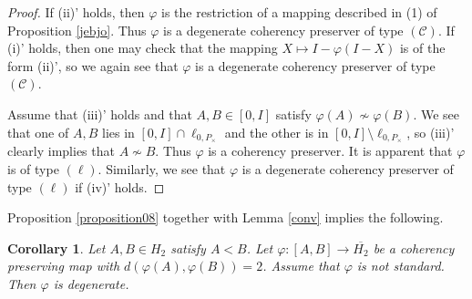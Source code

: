\documentclass[10pt]{amsart}
\newtheorem{corollary}[theorem]{Corollary}
\theoremstyle{definition}
\theoremstyle{remark}
\numberwithin{subsection}{section}
\numberwithin{equation}{section}
\newcommand\oH{{\overline{H_2}}}
\begin{document}
\begin{proof}
If (ii)' holds, then $\varphi$ is the restriction of a mapping described in (1) of Proposition \ref{jebjo}. 
Thus $\varphi$ is a degenerate coherency preserver of type $(\mathcal{C})$. 
If (i)' holds, then one may check that the mapping $X\mapsto I-\varphi(I-X)$ is of the form (ii)', so we again see that $\varphi$ is a degenerate coherency preserver of type $(\mathcal{C})$.

Assume that (iii)' holds 
and that $A, B\in [0,I]$ satisfy $\varphi(A)\not\sim\varphi(B)$. 
We see that one of $A, B$ lies in $[0,I]\cap \ell_{0,P_\times}$ and the other is in $[0,I]\setminus \ell_{0,P_\times}$, so (iii)' clearly implies that $A\not\sim B$. 
Thus $\varphi$ is a coherency preserver. 
It is apparent that $\varphi$ is of type $(\ell)$. 
Similarly, we see that $\varphi$ is a degenerate coherency preserver of type $(\ell)$ if (iv)' holds.
\end{proof}


Proposition \ref{proposition08} together with Lemma \ref{conv} implies the following.
\begin{corollary}\label{d=2}
Let $A, B\in H_2$ satisfy $A<B$. 
Let $\varphi\colon [A, B]\to \oH$ be a coherency preserving map with $d(\varphi(A), \varphi(B))=2$. 
Assume that $\varphi$ is not standard.
Then $\varphi$ is degenerate.
\end{corollary}
\end{document}
